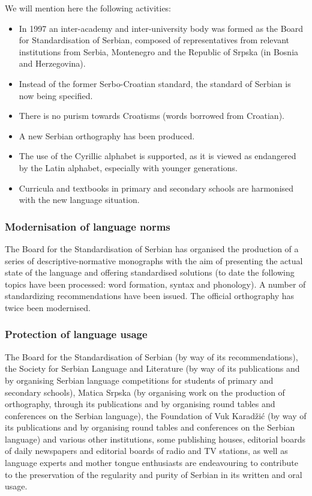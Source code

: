 \begin{multicols}{2}
 We will mention here the following activities:
\begin{itemize}
\item In 1997 an inter-academy and inter-university body was formed as the Board for Standardisation of Serbian, \cite{BSSL} composed of representatives from relevant institutions from Serbia, Montenegro and the Republic of Srpska (in Bosnia and Herzegovina).
\item Instead of the former Serbo-Croatian standard, the standard of Serbian is now being specified.
\item There is no purism towards Croatisms (words borrowed from Croatian).
\item A new Serbian orthography has been produced.
\item The use of the Cyrillic alphabet is supported, as it is viewed as endangered by the Latin alphabet, especially with younger generations.
\item Curricula and textbooks in primary and secondary schools are harmonised with the new language situation.
 \end{itemize}

 \subsubsection {Modernisation of language norms}

The Board for the Standardisation of Serbian has organised the production of a series of descriptive-normative monographs with the aim of presenting the actual state of the language and offering standardised solutions (to date the following topics have been processed: word formation, syntax and phonology). A number of standardizing recommendations have been issued. The official orthography has twice been modernised.

 \subsubsection {Protection of language usage}
 
 
The Board for the Standardisation of Serbian (by way of its recommendations), the Society for Serbian Language and Literature (by way of its publications and by organising Serbian language competitions for students of primary and secondary schools), Matica Srpska (by organising work on the production of orthography, through its publications and by organising round tables and conferences on the Serbian language), the Foundation of Vuk Karadžić (by way of its publications and by organising round tables and conferences on the Serbian language) and various other institutions, some publishing houses, editorial boards of daily newspapers and editorial boards of radio and TV stations, as well as language experts and  mother tongue enthusiasts are endeavouring to contribute to the preservation of the regularity and purity of Serbian in its written and oral usage. 
 

\end{multicols}
